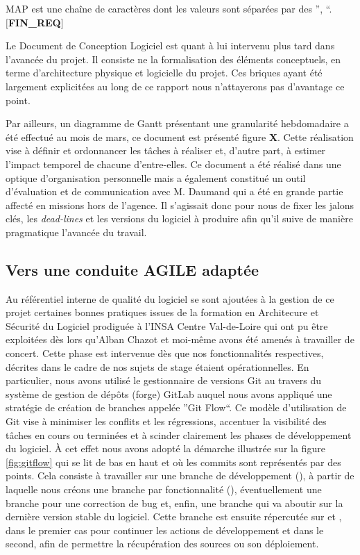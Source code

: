     \hspace{10mm} MAP est une chaîne de caractères dont les valeurs sont séparées par des '', ``.\\ 
  \textbf{$[$FIN\_REQ$]$}
  
  Le Document de Conception Logiciel est quant à lui intervenu plus tard dans l'avancée du projet. 
  Il consiste ne la formalisation des éléments conceptuels, en terme d'architecture physique et logicielle du projet. 
  Ces briques ayant été largement explicitées au long de ce rapport nous n'attayerons pas d'avantage ce point. 
  
  Par ailleurs, un diagramme de Gantt présentant une granularité hebdomadaire a été effectué au mois de mars, ce document est présenté figure \textbf{X}.
  Cette réalisation vise à définir et ordonnancer les tâches à réaliser et, d'autre part, à estimer l'impact temporel de chacune d'entre-elles. 
  Ce document a été réalisé dans une optique d'organisation personnelle mais a également constitué un outil d'évaluation et de communication avec M. Daumand qui a été en grande partie affecté en missions hors de l'agence. 
  Il s'agissait donc pour nous de fixer les jalons clés, les \emph{dead-lines} et les versions du logiciel à produire afin qu'il suive de manière pragmatique l'avancée du travail. 
  
  \subsection{Vers une conduite AGILE adaptée}
  
  Au référentiel interne de qualité du logiciel se sont ajoutées à la gestion de ce projet certaines bonnes pratiques issues de la formation en Architecure et Sécurité du Logiciel prodiguée à l'INSA Centre Val-de-Loire
  qui ont pu être exploitées dès lors qu'Alban Chazot et moi-même avons été amenés à travailler de concert.
  Cette phase est intervenue dès que nos fonctionnalités respectives, décrites dans le cadre de nos sujets de stage étaient opérationnelles.  
  En particulier, nous avons utilisé le gestionnaire de versions Git au travers du système de gestion de dépôts (forge) GitLab auquel nous avons appliqué une stratégie de création de branches appelée ''Git Flow``.
  Ce modèle d'utilisation de Git vise à minimiser les conflits et les régressions, accentuer la visibilité des tâches en cours ou terminées et à scinder clairement les phases de développement du logiciel. 
  \`{A} cet effet nous avons adopté la démarche illustrée sur la figure \ref{fig:gitflow} qui se lit de bas en haut et où les commits sont représentés par des points.
  Cela consiste à travailler sur une branche de développement (), à partir de laquelle nous créons une branche par fonctionnalité (), éventuellement une branche  pour une correction de bug
  et, enfin, une branche  qui va aboutir sur la dernière version stable du logiciel.
  Cette branche est ensuite répercutée sur  et , dans le premier cas  pour continuer les actions de développement et dans le second, afin de permettre la récupération des sources ou son déploiement. 
  
